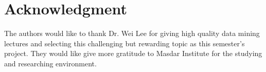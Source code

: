 \documentclass[journal]{IEEEtran}
\begin{document}






%


\appendices



\section*{Acknowledgment}


The authors would like to thank Dr. Wei Lee for giving high quality data mining lectures and selecting this challenging but rewarding topic as this semester's project. They would like give more gratitude to Masdar Institute for the studying and researching environment.
\end{document}
